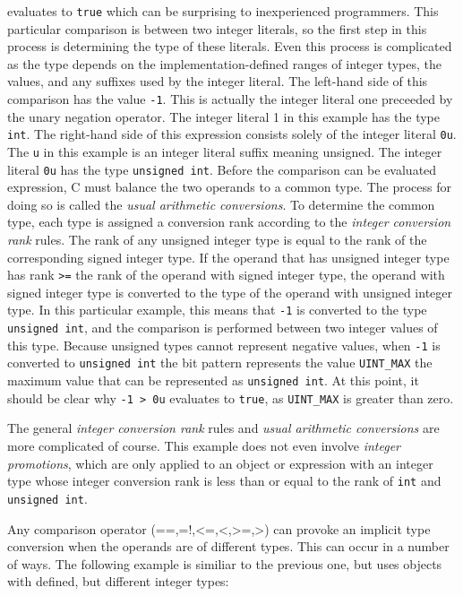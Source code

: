 \documentclass[11pt,letterpaper]{article}
\begin{document}
evaluates to \texttt{true} which can be surprising to inexperienced programmers.
This particular comparison is between two integer literals, so the first step in this process is determining the type of these literals.
Even this process is complicated as the type depends on the implementation-defined ranges of integer types, the values, and any suffixes used by the integer literal.
The left-hand side of this comparison has the value \texttt{-1}.
This is actually the integer literal one preceeded by the unary negation operator.
The integer literal 1 in this example has the type \texttt{int}.
The right-hand side of this expression consists solely of the integer literal \texttt{0u}.
The \texttt{u} in this example is an integer literal suffix meaning unsigned.
The integer literal \texttt{0u}  has the type \texttt{unsigned int}.
Before the comparison can be evaluated expression, C must balance the two operands to a common type.
The process for doing so is called the \emph{usual arithmetic conversions}.
To determine the common type, each type is assigned a conversion rank according to the \emph{integer conversion rank} rules.
The rank of any unsigned integer type is equal to the rank of the corresponding signed integer type.
If the operand that has unsigned integer type has rank \texttt{>=} the rank of the operand with signed integer type, the operand with signed integer type is converted to the type of the operand with unsigned integer type.
In this particular example, this means that \texttt{-1} is converted to the type \texttt{unsigned int}, and the comparison is performed between two integer values of this type.
Because unsigned types cannot represent negative values, when \texttt{-1} is converted to \texttt{unsigned int} the bit pattern represents the value \texttt {UINT\_MAX} the maximum value that can be represented as \texttt{unsigned int}.
At this point, it should be clear why \texttt{-1 > 0u} evaluates to \texttt{true}, as \texttt {UINT\_MAX} is greater than zero.

The general \emph{integer conversion rank} rules and \emph{usual arithmetic conversions} are more complicated of course.
This example does not even involve \emph{integer promotions}, which are only applied to an object or expression with an integer type whose integer conversion rank is less than or equal to the rank of \texttt{int} and \texttt{unsigned int}.  

Any comparison operator (==,=!,\textless=,\textless,\textgreater=,\textgreater) can provoke an implicit type conversion when the operands are of different types. 
This can occur in a number of ways. 
The following example is similiar to the previous one, but uses objects with defined, but different integer types:
\end{document}
